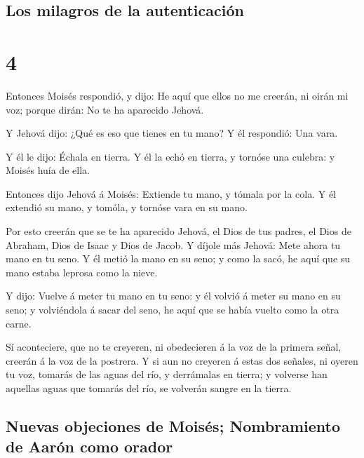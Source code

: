 \hypertarget{los-milagros-de-la-autenticaciuxf3n}{%
\subsection{Los milagros de la
autenticación}\label{los-milagros-de-la-autenticaciuxf3n}}

\hypertarget{section-3}{%
\section{4}\label{section-3}}

 Entonces Moisés respondió, y dijo: He aquí que ellos no me
creerán, ni oirán mi voz; porque dirán: No te ha aparecido Jehová.

 Y Jehová dijo: ¿Qué es eso que tienes en tu mano? Y él
respondió: Una vara.

 Y él le dijo: Échala en tierra. Y él la echó en tierra, y
tornóse una culebra: y Moisés huía de ella.

 Entonces dijo Jehová á Moisés: Extiende tu mano, y tómala
por la cola. Y él extendió su mano, y tomóla, y tornóse vara en su mano.

 Por esto creerán que se te ha aparecido Jehová, el Dios de
tus padres, el Dios de Abraham, Dios de Isaac y Dios de Jacob.
 Y díjole más Jehová: Mete ahora tu mano en tu seno. Y él
metió la mano en su seno; y como la sacó, he aquí que su mano estaba
leprosa como la nieve.

 Y dijo: Vuelve á meter tu mano en tu seno: y él volvió á
meter su mano en su seno; y volviéndola á sacar del seno, he aquí que se
había vuelto como la otra carne.

 Sí aconteciere, que no te creyeren, ni obedecieren á la voz
de la primera señal, creerán á la voz de la postrera.  Y si
aun no creyeren á estas dos señales, ni oyeren tu voz, tomarás de las
aguas del río, y derrámalas en tierra; y volverse han aquellas aguas que
tomarás del río, se volverán sangre en la tierra.

\hypertarget{nuevas-objeciones-de-moisuxe9s-nombramiento-de-aaruxf3n-como-orador}{%
\subsection{Nuevas objeciones de Moisés; Nombramiento de Aarón como
orador}\label{nuevas-objeciones-de-moisuxe9s-nombramiento-de-aaruxf3n-como-orador}}

